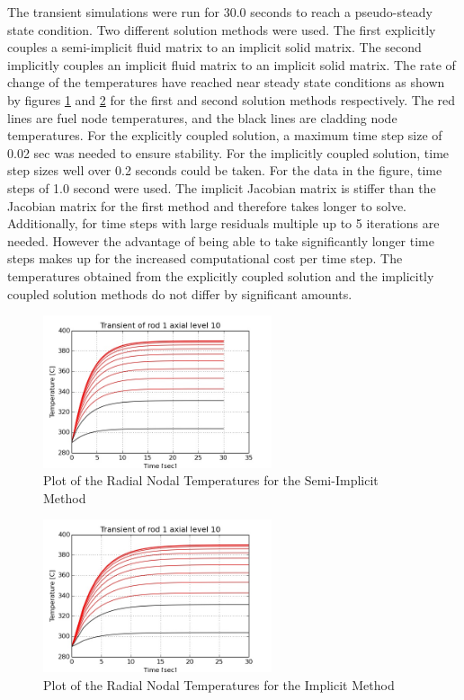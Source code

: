 The transient simulations were run for 30.0 seconds to reach a pseudo-steady
state condition. Two different solution methods were used. The first 
explicitly couples a semi-implicit fluid matrix to an implicit solid matrix.
The second implicitly couples an implicit fluid matrix to an implicit solid
matrix. The rate of change of the temperatures have reached near steady state
conditions as shown by figures \ref{fig:trans_rod1_axial10_SI} and
\ref{fig:trans_rod1_axial10_I} for the first and second solution methods
respectively. The red lines are fuel node temperatures, and the black lines are
cladding node temperatures. For the explicitly coupled solution, a maximum time
step size of 0.02 sec was needed to ensure stability. For the implicitly coupled
solution, time step sizes well over 0.2 seconds could be taken. For the data in
the figure, time steps of 1.0 second were used. The implicit Jacobian matrix is
stiffer than the Jacobian matrix for the first method and therefore takes longer
to solve. Additionally, for time steps with large residuals multiple up to 5
iterations are needed. However the advantage of being able to take
significantly longer time steps makes up for the increased computational cost
per time step. The temperatures obtained from the explicitly coupled solution
and the implicitly coupled solution methods do not differ by significant
amounts.

\begin{figure}[!h]
	\centering
	\includegraphics[width=0.60\textwidth]{images/trans_rod1_axial10_SI.jpg}
	\caption{Plot of the Radial Nodal Temperatures for the Semi-Implicit Method}
	\label{fig:trans_rod1_axial10_SI}
\end{figure}

\begin{figure}[!h]
	\centering
	\includegraphics[width=0.60\textwidth]{images/trans_rod1_axial10_I.jpg}
	\caption{Plot of the Radial Nodal Temperatures for the Implicit Method}
	\label{fig:trans_rod1_axial10_I}
\end{figure}

